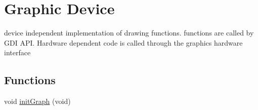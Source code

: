 \hypertarget{group__graphic__device}{
\section{Graphic Device}
\label{group__graphic__device}
}
device independent implementation of drawing functions. functions are called by GDI API. Hardware dependent code is called through the graphics hardware interface  


\subsection*{Functions}
\begin{CompactItemize}
\item 
\hypertarget{group__graphic__device_g477dd2821cac07b0dd56d67a72eacaba}{
void \hyperlink{group__graphic__device_g477dd2821cac07b0dd56d67a72eacaba}{initGraph} (void)}
\label{group__graphic__device_g477dd2821cac07b0dd56d67a72eacaba}


\end{CompactItemize}
